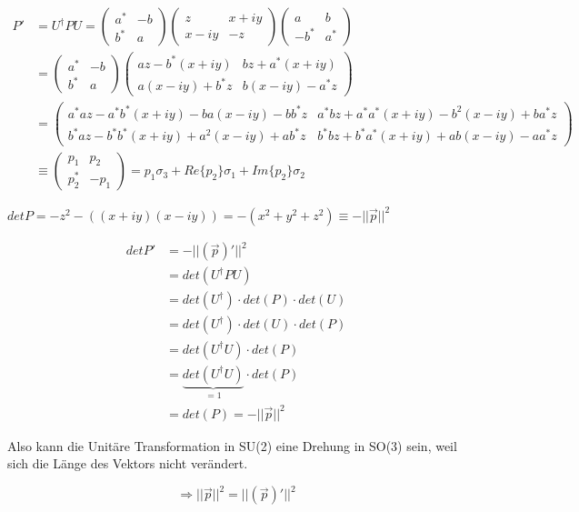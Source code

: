 \begin{enumerate}
\begin{align}
 P'&=U^\dagger PU =\begin{pmatrix}a^*&-b\\b^*&a\end{pmatrix}\begin{pmatrix} z&x+iy\\x-iy&-z\end{pmatrix}\begin{pmatrix}a&b\\-b^*&a^*\end{pmatrix}\\
&=\begin{pmatrix}a^*&-b\\b^*&a\end{pmatrix}\begin{pmatrix} az-b^*(x+iy)&bz+a^*(x+iy)\\ a(x-iy)+b^*z&b(x-iy)-a^*z \end{pmatrix}\\
&=\begin{pmatrix}a^*az-a^*b^*(x+iy)-ba(x-iy)-bb^*z&a^*bz+a^*a^*(x+iy)-b^2(x-iy)+ba^*z\\b^*az-b^*b^*(x+iy)+a^2(x-iy)+ab^*z & b^*bz+b^*a^*(x+iy)+ab(x-iy)-aa^*z\end{pmatrix} \\
&\equiv\begin{pmatrix}p_1&p_2\\p_2^*&-p_1\end{pmatrix} = p_1\sigma_3+Re\{p_2\}\sigma_1+Im\{p_2\}\sigma_2
\end{align}


\(det P =  -z^2-((x+iy)(x-iy)) = -(x^2+y^2+z^2)\equiv -||\vec p||^2\)

\begin{align}
det P' &= -||(\vec p)'||^2 \\
&= det(U^\dagger P U) \\
&= det(U^\dagger)\cdot det(P)\cdot det(U) \\
&= det(U^\dagger)\cdot det(U) \cdot det(P) \\
&= det(U^\dagger U) \cdot det(P)\\
&= \underbrace{det(U^\dagger U)}_{=1}\cdot det(P) \\
&= det(P) = -||\vec p||^2
\end{align}


Also kann die Unitäre Transformation in SU(2) eine Drehung in SO(3) sein, weil sich die Länge des Vektors nicht verändert.

\[\Rightarrow ||\vec p||^2 = ||(\vec p)'||^2 \]



\end{enumerate}
